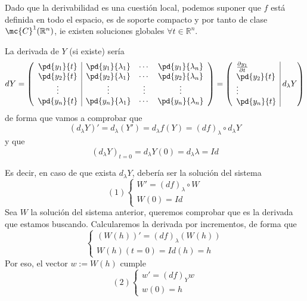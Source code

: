 \begin{dem}
Dado que la derivabilidad es una cuestión local, podemos suponer que $f$ está definida en todo el espacio, es de soporte compacto y por tanto de clase $\mc{C}^1(\mathbb R^n)$, ie existen soluciones globales $\forall t \in \mathbb R^n$.

La derivada de $Y$ (si existe) sería
$$dY=\left( \begin{array}{c | c c c}
    \pd{y_1}{t} & \pd{y_1}{\lambda_1} & \cdots & \pd{y_1}{\lambda_n} \\
    \pd{y_2}{t} & \pd{y_2}{\lambda_1} & \cdots & \pd{y_2}{\lambda_n} \\
    \vdots & \vdots & \vdots & \vdots \\
    \pd{y_n}{t} & \pd{y_n}{\lambda_1} & \cdots & \pd{y_n}{\lambda_n}
\end{array}  \right) =\left( \begin{array}{l |}
    \frac{\partial y_1}{\partial t}   \\
    \pd{y_2}{t}   \\
    \vdots \\
    \pd{y_n}{t}  
\end{array} \; d_{\lambda}Y \right)$$
de forma que vamos a comprobar que
$$(d_{\lambda}Y)' = d_{\lambda}(Y')=d_{\lambda}f(Y)=(df)_{\lambda} \circ d_{\lambda}Y$$
y que 
$$(d_{\lambda}Y)_{t=0}=d_{\lambda}Y(0)=d_{\lambda}\lambda=Id$$

Es decir, en caso de que exista $d_{\lambda}Y$, debería ser la solución del sistema
$$(1)\left\{ \begin{array}{l}
     W'=(df)_{\lambda} \circ W  \\
     W(0)=Id
\end{array} 
\right.$$
Sea $W$ la solución del sistema anterior, queremos comprobar que es la derivada que estamos buscando. Calcularemos la derivada por incrementos, de forma que
$$\left\{ \begin{array}{l}
     (W(h))'=(df)_{\lambda} (W(h))  \\
     W(h)(t=0)=Id(h)=h
\end{array} 
\right.$$
Por eso, el vector $w:=W(h)$ cumple
$$(2)\left\{ \begin{array}{l}
     w'=(df)_Y w  \\
     w(0)=h
\end{array} 
\right.$$


\end{dem}
